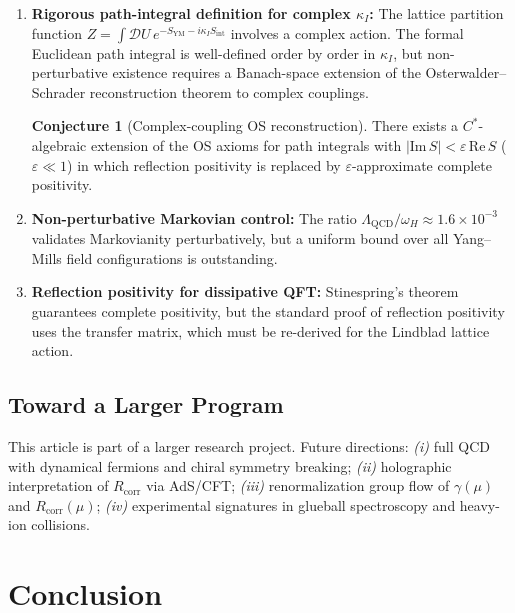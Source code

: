 \documentclass[12pt,a4paper]{article}
\theoremstyle{definition}
\newtheorem{conjecture}[theorem]{Conjecture}
\newcommand{\YM}{\mathrm{YM}}
\newcommand{\Rcorr}{R_{\mathrm{corr}}}
\begin{document}
\begin{enumerate}
  \item \textbf{Rigorous path-integral definition for complex $\kappa_{I}$:}
        The lattice partition function
        $Z = \int \mathcal{D}U\,e^{-S_{\YM} - i\kappa_{I} S_{\mathrm{int}}}$
        involves a complex action. The formal Euclidean path integral is
        well-defined order by order in $\kappa_{I}$, but non-perturbative
        existence requires a Banach-space extension of the Osterwalder--Schrader
        reconstruction theorem to complex couplings.

  \begin{conjecture}[Complex-coupling OS reconstruction]
  There exists a $C^{*}$-algebraic extension of the OS axioms for path
  integrals with $|\mathrm{Im}\,S| < \varepsilon\,\mathrm{Re}\,S$
  ($\varepsilon \ll 1$) in which reflection positivity is replaced by
  $\varepsilon$-approximate complete positivity.
  \end{conjecture}

  \item \textbf{Non-perturbative Markovian control:}
        The ratio $\Lambda_{\mathrm{QCD}}/\omega_{H} \approx 1.6 \times
        10^{-3}$ validates Markovianity perturbatively, but a uniform bound
        over all Yang--Mills field configurations is outstanding.

  \item \textbf{Reflection positivity for dissipative QFT:}
        Stinespring's theorem guarantees complete positivity, but the
        standard proof of reflection positivity uses the transfer matrix,
        which must be re-derived for the Lindblad lattice action.
\end{enumerate}

\subsection{Toward a Larger Program}

This article is part of a larger research project. Future directions:
\emph{(i)} full QCD with dynamical fermions and chiral symmetry breaking;
\emph{(ii)} holographic interpretation of $\Rcorr$ via AdS/CFT;
\emph{(iii)} renormalization group flow of $\gamma(\mu)$ and $\Rcorr(\mu)$;
\emph{(iv)} experimental signatures in glueball spectroscopy and
heavy-ion collisions.

\section{Conclusion}
\label{sec:conclusion}
\end{document}
